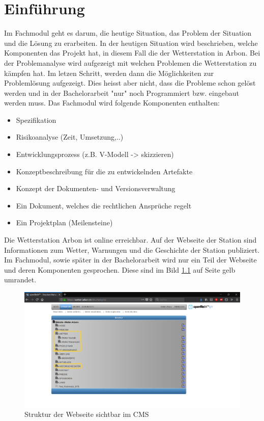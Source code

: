 \chapter{Einführung}

Im Fachmodul geht es darum, die heutige Situation, das Problem der Situation und die Lösung zu erarbeiten. In der heutigen Situation wird beschrieben, welche Komponenten das Projekt hat, in diesem Fall die der Wetterstation in Arbon. Bei der Problemanalyse wird aufgezeigt mit welchen Problemen die Wetterstation zu kämpfen hat. Im letzen Schritt, werden dann die Möglichkeiten zur Problemlösung aufgezeigt. Dies heisst aber nicht, dass die Probleme schon gelöst werden und in der Bachelorarbeit "nur" noch Programmiert bzw. eingebaut werden muss. Das Fachmodul wird folgende Komponenten enthalten:
 
\begin{itemize}  
\item Spezifikation
\item Risikoanalyse (Zeit, Umsetzung,..)
\item Entwicklungsprozess (z.B. V-Modell -> skizzieren)
\item Konzeptbeschreibung für die zu entwickelnden Artefakte
\item Konzept der Dokumenten- und Versionsverwaltung
\item Ein Dokument, welches die rechtlichen Ansprüche regelt
\item Ein Projektplan (Meilensteine)
\end{itemize}

Die Wetterstation Arbon ist online erreichbar. Auf der Webseite der Station sind Informationen zum Wetter, Warnungen und die Geschichte der Station publiziert. Im Fachmodul, sowie später in der Bachelorarbeit wird nur ein Teil der Webseite und deren Komponenten gesprochen. Diese sind im Bild \ref{img:cms_struktur} auf Seite \pageref{img:cms_struktur} gelb umrandet. 
\begin{figure}[htbp]
	\centering
	\includegraphics[width=0.9\linewidth]{img/cms_struktur}
	\caption{Struktur der Webseite sichtbar im CMS}
	\label{img:cms_struktur}
\end{figure}


